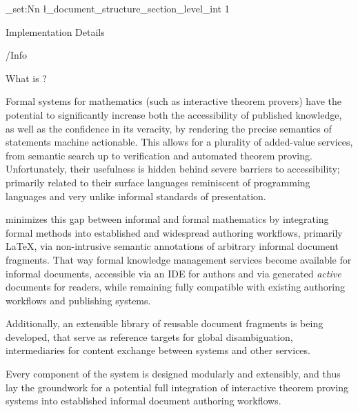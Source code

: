 \ExplSyntaxOn
\int_set:Nn \l_document_structure_section_level_int {1}
\ExplSyntaxOff

\clearpage

{%
  \def\\{:}%
  \tableofcontents
}

\clearpage
{}
	
\fi

\long{}


\begin{dangerbox}
  Implementation Details
\end{dangerbox}

\begin{mmtbox}
  \mmt/\omdoc Info
\end{mmtbox}


\begin{sfragment}{What is \sTeX?}
  
Formal systems for mathematics (such as interactive theorem provers)
have the potential to significantly increase both the accessibility
of published knowledge, as well as the confidence in its veracity,
by rendering the precise semantics of statements machine actionable.
This allows for a plurality of added-value services, from semantic
search up to verification and automated theorem proving.
Unfortunately, their usefulness is hidden behind severe barriers
to accessibility; primarily related to their surface languages
reminiscent of programming languages and very unlike informal
standards of presentation.

\sTeX minimizes this gap between informal and formal 
mathematics by integrating formal methods into established
and widespread authoring workflows, primarily \LaTeX, via 
non-intrusive semantic
annotations of arbitrary informal document fragments. That way
formal knowledge management services become available for informal
documents, accessible via an IDE for authors and via generated
\emph{active} documents for readers, while remaining fully compatible
with existing authoring workflows and publishing systems.

Additionally, an extensible library of reusable
document fragments is being developed, that serve as reference targets
for global disambiguation, intermediaries for content exchange
between systems and other services.

Every component of the system is designed modularly and extensibly,
and thus lay the groundwork for a potential full integration of
interactive theorem proving systems into established informal document
authoring workflows.


\end{sfragment}
